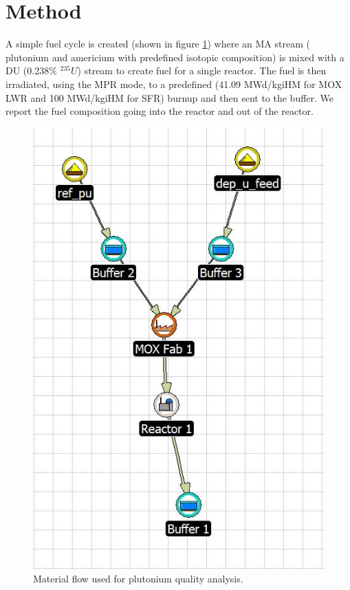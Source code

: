 \documentclass{article}
\begin{document}
\section{Method}

A simple fuel cycle is created (shown in figure \ref{fig:flow}) where an \gls{MA} stream
( plutonium and americium with predefined isotopic composition) is mixed with a \gls{DU} (0.238\% $^{235}U$)
stream to create fuel for a single reactor. The fuel is then irradiated, using the MPR mode, to a predefined (41.09 MWd/kgiHM for \gls{MOX} \gls{LWR}
and 100 MWd/kgiHM for \gls{SFR}) burnup and then sent to the buffer. We report the fuel composition going into the
reactor and out of the reactor.

\begin{figure}[htbp!]
    \begin{center}
        \includegraphics[scale=1.0]{./flow.jpg}
    \end{center}
    \caption{Material flow used for plutonium quality analysis.}
    \label{fig:flow}
\end{figure}
\end{document}
